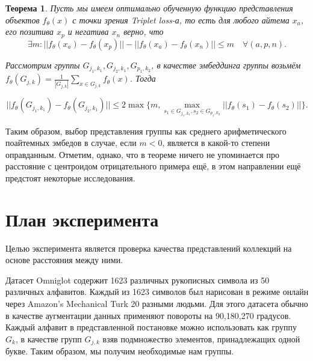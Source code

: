 \documentclass{article}
\newtheorem{theorem}{Теорема}
\begin{document}
\begin{theorem}

    Пусть мы имеем оптимально обученную функцию представления объектов $f_{\theta}(x)$ с точки зрения Triplet loss-а, то есть для любого айтема $x_a$, его позитива $x_p$ и негатива $x_n$ верно, что
    $$
    \exists m : ||f_{\theta}(x_a) - f_{\theta}(x_p)|| - ||f_{\theta}(x_a) - f_{\theta}(x_n)|| \leq m \quad \forall (a, p, n).
    $$

    Рассмотрим группы $G_{j_1, k_1}, G_{j_2, k_1}, G_{p_1, k_2}$, в качестве эмбеддинга группы возьмём $f_{\theta}(G_{j, k}) = \frac{1}{|G_{j, k}|}\sum_{x \in G_{j, k}}f_\theta(x)$. Тогда

    $$
    || f_{\theta}(G_{j_1, k_1}) - f_{\theta}(G_{j_2, k_1}) || \leq 2\max\{m, \max_{s_1 \in G_{j_1, k_1}, s_2 \in G_{p_1, k_2}}{||f_{\theta}(s_1) - f_{\theta}(s_2)||}\}.
    $$

\end{theorem}

Таким образом, выбор представления группы как среднего арифметического поайтемных эмбедов в случае, если $m < 0$, является в какой-то степени оправданным. Отметим, однако, что в теореме ничего не упоминается про расстояние с центроидом отрицательного примера ещё, в этом направлении ещё предстоят некоторые исследования.

\section{План эксперимента}

Целью эксперимента является проверка качества представлений коллекций на основе расстояния между ними.

Датасет Omniglot \cite{doi:10.1126/science.aab3050} содержит 1623 различных рукописных символа из 50 различных алфавитов. Каждый из 1623 символов был нарисован в режиме онлайн через Amazon's Mechanical Turk 20 разными людьми. Для этого датасета обычно в качестве аугментации данных применяют повороты на 90,180,270 градусов.
Каждый алфавит в представленной постановке можно использовать как группу $G_k$, в качестве групп $G_{j, k}$ взяв подмножество элементов, принадлежащих одной букве. Таким образом, мы получим необходимые нам группы.
\end{document}

